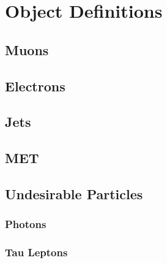 \chapter{Object Definitions}

\section{Muons}

\section{Electrons}

\section{Jets}

\section{MET}

\section{Undesirable Particles}

\subsection{Photons}

\subsection{Tau Leptons}
